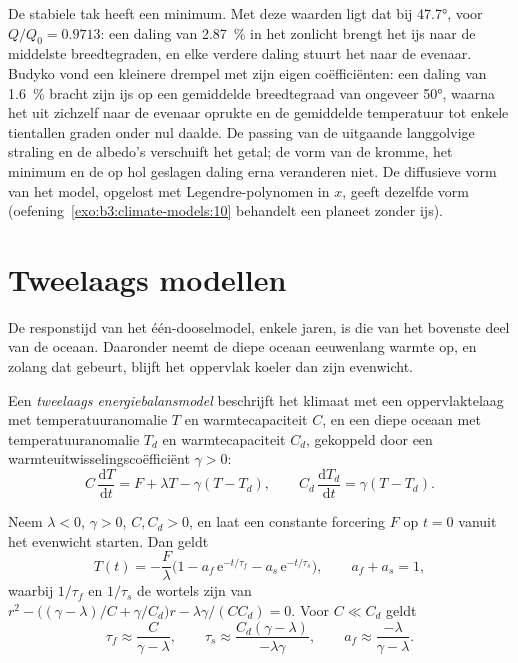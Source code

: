 
De stabiele tak heeft een minimum. Met deze waarden ligt dat bij \ang{47.7},
voor $Q/Q_0 = \num{0.9713}$: een daling van \qty{2.87}{\percent} in het zonlicht
brengt het ijs naar de middelste breedtegraden, en elke verdere daling stuurt het
naar de evenaar. Budyko vond een kleinere drempel met zijn eigen coëfficiënten: een
daling van \qty{1.6}{\percent} bracht zijn ijs op een gemiddelde breedtegraad van ongeveer
\ang{50}, waarna het uit zichzelf naar de evenaar oprukte en de gemiddelde
temperatuur tot enkele tientallen graden onder nul daalde. De passing van de uitgaande
langgolvige straling en de albedo's verschuift het getal; de vorm van de kromme, het minimum en de
op hol geslagen daling erna veranderen niet. De diffusieve vorm van het model, opgelost met
Legendre-polynomen in $x$, geeft dezelfde vorm (oefening~\ref{exo:b3:climate-models:10}
behandelt een planeet zonder ijs).

\section{Tweelaags modellen}\label{sec:b3:climate-models:two-layer}

De responstijd van het één-dooselmodel, enkele jaren, is die van het bovenste
deel van de oceaan. Daaronder neemt de diepe oceaan eeuwenlang warmte op, en zolang
dat gebeurt, blijft het oppervlak koeler dan zijn evenwicht.

\begin{definition}\label{def:b3:climate-models:two-layer}
Een \emph{tweelaags energiebalansmodel}
beschrijft het klimaat met een oppervlaktelaag met temperatuuranomalie $T$
en warmtecapaciteit $C$, en een diepe oceaan met temperatuuranomalie $T_d$ en
warmtecapaciteit $C_d$, gekoppeld door een warmteuitwisselingscoëfficiënt $\gamma > 0$:
\[
C\,\frac{\mathrm dT}{\mathrm dt} = F + \lambda T - \gamma(T - T_d), \qquad
C_d\,\frac{\mathrm dT_d}{\mathrm dt} = \gamma(T - T_d) .
\]
\end{definition}

\begin{theorem}\label{thm:b3:climate-models:two-layer}
Neem $\lambda < 0$, $\gamma > 0$, $C, C_d > 0$, en laat een constante forcering
$F$ op $t = 0$ vanuit het evenwicht starten. Dan geldt
\[
T(t) = -\frac{F}{\lambda}\Big(1 - a_f\,\mathrm e^{-t/\tau_f} - a_s\,\mathrm
e^{-t/\tau_s}\Big), \qquad a_f + a_s = 1 ,
\]
waarbij $1/\tau_f$ en $1/\tau_s$ de wortels zijn van $r^2 - \big((\gamma -
\lambda)/C + \gamma/C_d\big)r - \lambda\gamma/(CC_d) = 0$. Voor $C \ll C_d$ geldt
\[
\tau_f \approx \frac{C}{\gamma - \lambda}, \qquad
\tau_s \approx \frac{C_d(\gamma - \lambda)}{-\lambda\gamma}, \qquad
a_f \approx \frac{-\lambda}{\gamma - \lambda} .
\]
\end{theorem}

